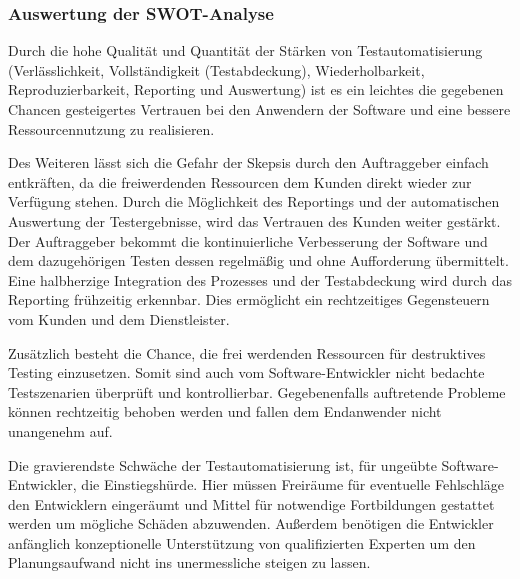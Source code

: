 \subsubsection{Auswertung der SWOT-Analyse}
Durch die hohe Qualität und Quantität der Stärken von Testautomatisierung (Verlässlichkeit, Vollständigkeit (Testabdeckung), Wiederholbarkeit, Reproduzierbarkeit, Reporting und Auswertung) ist es ein leichtes die gegebenen Chancen gesteigertes Vertrauen bei den Anwendern der Software und eine bessere Ressourcennutzung zu realisieren. 

Des Weiteren lässt sich die Gefahr der Skepsis durch den Auftraggeber einfach entkräften, da die freiwerdenden Ressourcen dem Kunden direkt wieder zur Verfügung stehen. Durch die Möglichkeit des Reportings und der automatischen Auswertung der Testergebnisse, wird das Vertrauen des Kunden weiter gestärkt. Der Auftraggeber bekommt die kontinuierliche Verbesserung der Software und dem dazugehörigen Testen dessen regelmäßig und ohne Aufforderung übermittelt. Eine halbherzige Integration des Prozesses und der Testabdeckung wird durch das Reporting frühzeitig erkennbar. Dies ermöglicht ein rechtzeitiges Gegensteuern vom Kunden und dem Dienstleister.

Zusätzlich besteht die Chance, die frei werdenden Ressourcen für destruktives Testing einzusetzen. Somit sind auch vom Software-Entwickler nicht bedachte Testszenarien überprüft und kontrollierbar. Gegebenenfalls auftretende Probleme können rechtzeitig behoben werden und fallen dem Endanwender nicht unangenehm auf.

Die gravierendste Schwäche der Testautomatisierung ist, für ungeübte Software-Entwickler, die Einstiegshürde. Hier müssen Freiräume für eventuelle Fehlschläge den Entwicklern eingeräumt und Mittel für notwendige Fortbildungen gestattet werden um mögliche Schäden abzuwenden. Außerdem benötigen die Entwickler anfänglich konzeptionelle Unterstützung von qualifizierten Experten um den Planungsaufwand nicht ins unermessliche steigen zu lassen.

